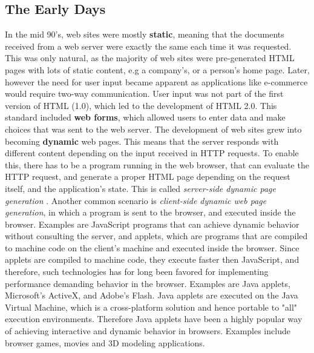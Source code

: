 \subsection{The Early Days}
In the mid 90's, web sites were mostly \textbf{static}, meaning that the documents received from a web server were exactly the same each time it was requested. This was only natural, as the majority of web sites were pre-generated HTML pages with lots of static content, e.g a company's, or a person's home page. Later, however the need for user input became apparent as applications like e-commerce would require two-way communication. User input was not part of the first version of HTML (1.0), which led to the development of HTML 2.0. This standard included \textbf{web forms}, which allowed users to enter data and make choices that was sent to the web server. The development of web sites grew into becoming \textbf{dynamic} web pages. This means that the server responds with different content depending on the input received in HTTP requests. To enable this, there has to be a program running in the web browser, that can evaluate the HTTP request, and generate a proper HTML page depending on the request itself, and the application's state. This is called \textit{server-side dynamic page generation} \cite[p.691]{tanumbaum}. Another common scenario is \textit{client-side dynamic web page generation}, in which a program is sent to the browser, and executed inside the browser. Examples are JavaScript programs that can achieve dynamic behavior without consulting the server, and applets, which are programs that are compiled to machine code on the client's machine and executed inside the browser. Since applets are compiled to machine code, they execute faster then JavaScript, and therefore, such technologies has for long been favored for implementing performance demanding behavior in the browser. Examples are Java applets, Microsoft's ActiveX,\cite{activex} and Adobe's Flash.\cite{flash} Java applets are executed on the Java Virtual Machine, which is a cross-platform solution and hence portable to "all" execution environments. Therefore Java applets have been a highly popular way of achieving interactive and dynamic behavior in browsers. Examples include browser games, movies and 3D modeling applications. 

